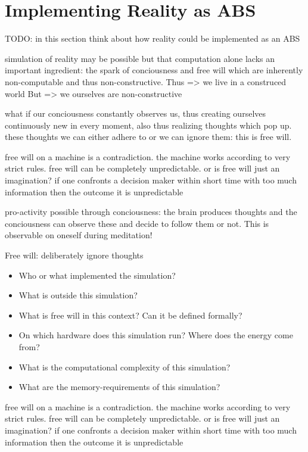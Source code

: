 \section{Implementing Reality as ABS}
TODO: in this section think about how reality could be implemented as an ABS

simulation of reality may be possible but that computation alone lacks an important ingredient: the spark of conciousness and free will which are inherently non-computable and thus non-constructive. 
Thus => we live in a construced world
But => we ourselves are non-constructive


what if our conciousness constantly observes us, thus creating ourselves continuously new in every moment, also thus realizing thoughts which pop up. these thoughts we can either adhere to or we can ignore them: this is free will.

free will on a machine is a contradiction. the machine works according to very strict rules. free will can be completely unpredictable. or is free will just an imagination? if one confronts a decision maker within short time with too much information then the outcome it is unpredictable 

pro-activity possible through conciousness: the brain produces thoughts and the conciousness can observe these and decide to follow them or not. This is observable on oneself during meditation!

Free will: deliberately ignore thoughts

\begin{itemize}
\item Who or what implemented the simulation?
\item What is outside this simulation?
\item What is free will in this context? Can it be defined formally?
\item On which hardware does this simulation run? Where does the energy come from?
\item What is the computational complexity of this simulation?
\item What are the memory-requirements of this simulation?
\end{itemize}

free will on a machine is a contradiction. the machine works according to very strict rules. free will can be completely unpredictable. or is free will just an imagination? if one confronts a decision maker within short time with too much information then the outcome it is unpredictable 

